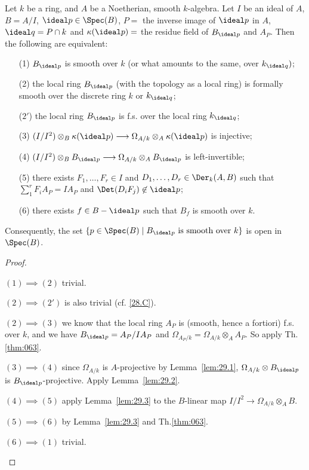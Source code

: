 \documentclass[../main]{subfiles}
\begin{document}
\begin{partheorem}
\label{thm:064}
Let $k$ be a ring, and $A$ be a Noetherian, smooth $k$-algebra. Let $I$ be an ideal of $A$, $B = A/I$, $\ideal p \in \Spec(B)$, $P = $ the inverse image of $\ideal p$ in $A$, $\ideal q = P \cap k$ and $\kappa(\ideal p) = $ the residue field of $B_{\ideal p}$ and $A_P$. Then the following are equivalent: 

\begin{enumerate}
    \item[(1)] $B_{\ideal p}$ is smooth over $k$ (or what amounts to the same, over $k_{\ideal q})$;
    \item[(2)] the local ring $B_{\ideal p}$ (with the topology as a local ring) is formally smooth over the discrete ring $k$ or $k_{\ideal q}$;
    \item[($2'$)] the local ring $B_{\ideal p}$ is f.s. over the local ring $k_{\ideal q}$;
    \item[(3)] $(I/I^2) \otimes_B \kappa(\ideal p) \longrightarrow \Omega_{A/k} \otimes_A \kappa(\ideal p)$ is injective;
    \item[(4)] $(I/I^2) \otimes_B B_{\ideal p} \longrightarrow \Omega_{A/k} \otimes_A B_{\ideal p}$ is left-invertible;
    \item[(5)] there exists $F_1, \ldots, F_r \in I$ and $D_1, \ldots, D_r \in \Der_k(A,B)$ such that \newline $\sum_1^r F_i A_P = IA_P$ and $\Det(D_i F_j) \not \in \ideal p$;
    \item[(6)] there exists $f \in B - \ideal p$ such that $B_f$ is smooth over $k$.
\end{enumerate}

Consequently, the set $\{p \in \Spec(B) \mid B_{\ideal p} \text { is smooth over } k\}$ is open in\linebreak$\Spec(B)$.
\end{partheorem}

\begin{proof}\phantom{,}
\begin{implyenumerate}
    \item[$(1) \implies (2)$] trivial.
    \item[$(2) \implies (2')$] is also trivial (cf. \ref{28.C}).
    \item[$(2) \implies (3)$] we know that the local ring $A_P$ is (smooth, hence a fortiori) f.s. over $k$, and we have $B_{\ideal p} = A_P/I A_P$ and $\Omega_{A_P/k} = \Omega_{A/k} \otimes_A A_P$. So apply Th.\ref{thm:063}.
    \item[$(3) \implies (4)$] since $\Omega_{A/k}$ is $A$-projective by Lemma~\ref{lem:29.1}, $\Omega_{A/k} \otimes B_{\ideal p}$ is $B_{\ideal p}$-projective. Apply Lemma~\ref{lem:29.2}.
    \item[$(4) \implies (5)$] apply Lemma~\ref{lem:29.3} to the $B$-linear map $I/I^2 \longrightarrow \Omega_{A/k} \otimes_A B$.
    \item[$(5) \implies (6)$] by Lemma~\ref{lem:29.3} and Th.\ref{thm:063}.
    \item[$(6) \implies (1)$] trivial.
\end{implyenumerate}

\end{proof}
\end{document}
